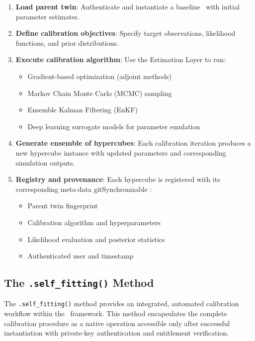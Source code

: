 \begin{enumerate}
\item \textbf{Load parent twin}: Authenticate and instantiate a baseline \hydrot\ with initial parameter estimates.

\item \textbf{Define calibration objectives}: Specify target observations, likelihood functions, and prior distributions.

\item \textbf{Execute calibration algorithm}: Use the Estimation Layer to run:
\begin{itemize}
    \item Gradient-based optimization (adjoint methods)
    \item Markov Chain Monte Carlo (MCMC) sampling
    \item Ensemble Kalman Filtering (EnKF)
    \item Deep learning surrogate models for parameter emulation
\end{itemize}

\item \textbf{Generate ensemble of hypercubes}: Each calibration iteration produces a new hypercube instance with updated parameters and corresponding simulation outputs.

\item \textbf{Registry and provenance}: Each hypercube is registered with its corresponding meta-data gitSynchronizable :
\begin{itemize}
    \item Parent twin fingerprint
    \item Calibration algorithm and hyperparameters
    \item Likelihood evaluation and posterior statistics
    \item Authenticated user and timestamp
\end{itemize}
\end{enumerate}

\subsection{The \texttt{.self\_fitting()} Method}

The \texttt{.self\_fitting()} method provides an integrated, automated calibration workflow within the \hydrot\ framework. This method encapsulates the complete calibration procedure as a native operation accessible only after successful instantiation with private-key authentication and entitlement verification.

